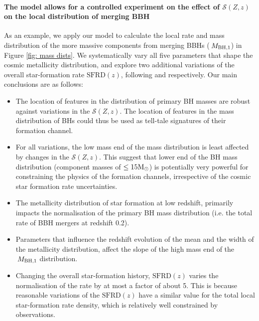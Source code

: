\documentclass[twocolumn]{aastex631}
\newcommand{\Msun}{\ensuremath{\rm{M}_{\odot}}\xspace}
\newcommand{\Mbheen}{\ensuremath{\,M_{\rm BH, 1}}\xspace}
\newcommand{\SFRDzZ}{\ensuremath{\mathcal{S}(Z,z)}\xspace}
\newcommand{\SFRDz}{\ensuremath{\mathrm{SFRD}(z)}\xspace}
\begin{document}
\paragraph{The model allows for a controlled experiment on the effect of \SFRDzZ on the local distribution of merging BBH}
As an example, we apply our model to calculate the local rate and mass distribution of the more massive components from merging BBHs (\Mbheen) in Figure \ref{fig: mass dists}. 
We systematically vary all five parameters that shape the cosmic metallicity distribution, and explore two additional variations of the overall star-formation rate \SFRDz, following \cite{Madau+2017} and \cite{Neijssel+2019} respectively. 
Our main conclusions are as follows:
\begin{itemize}
    
    \item The location of features in the distribution of primary BH masses are robust against variations in the \SFRDzZ. The location of features in the mass distribution of BHs could thus be used as tell-tale signatures of their formation channel. 
    
    \item For all variations, the low mass end of the mass distribution is least affected by changes in the \SFRDzZ. This suggest that lower end of the BH mass distribution (component masses of $\leq 15\Msun$) is potentially very powerful for constraining the physics of the formation channels, irrespective of the cosmic star formation rate uncertainties.
    
    \item The metallicity distribution of star formation at low redshift, primarily impacts the normalisation of the primary BH mass distribution (i.e. the total rate of BBH mergers at redshift 0.2).
    
    \item Parameters that influence the redshift evolution of the mean and the width of the metallicity distribution, affect the slope of the high mass end of the \Mbheen distribution. %
    \item Changing the overall star-formation history, \SFRDz varies the normalisation of the rate by at most a factor of about 5. This is because reasonable variations of the \SFRDz have a similar value for the total local star-formation rate density, which is relatively well constrained by observations. 
    
\end{itemize}
\end{document}
